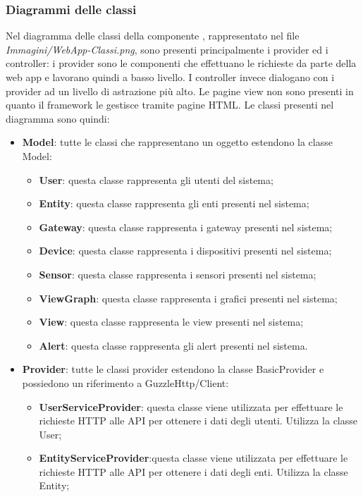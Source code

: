 	\subsubsection{Diagrammi delle classi}%
	Nel diagramma delle classi della componente , rappresentato nel file \textit{Immagini/WebApp-Classi.png}, sono presenti principalmente i provider ed i controller: i provider sono le componenti che effettuano le richieste  da parte della web app e lavorano quindi a basso livello.
	\newline
	I controller invece dialogano con i provider ad un livello di astrazione più alto. Le pagine view non sono presenti in quanto il framework  le gestisce tramite pagine HTML.
	Le classi presenti nel diagramma sono quindi:
	\begin{itemize}
		\item \textbf{Model}: tutte le classi che rappresentano un oggetto estendono la classe Model:
		\begin{itemize}
			\item \textbf{User}: questa classe rappresenta gli utenti del sistema;
			\item \textbf{Entity}: questa classe rappresenta gli enti presenti nel sistema;
			\item \textbf{Gateway}: questa classe rappresenta i gateway presenti nel sistema;
			\item \textbf{Device}: questa classe rappresenta i dispositivi presenti nel sistema;
			\item \textbf{Sensor}: questa classe rappresenta i sensori presenti nel sistema;
			\item \textbf{ViewGraph}: questa classe rappresenta i grafici presenti nel sistema;
			\item \textbf{View}: questa classe rappresenta le view presenti nel sistema;
			\item \textbf{Alert}: questa classe rappresenta gli alert presenti nel sistema.
		\end{itemize}
		\item \textbf{Provider}: tutte le classi provider estendono la classe BasicProvider e possiedono un riferimento a GuzzleHttp/Client:
		\begin{itemize}
			\item \textbf{UserServiceProvider}: questa classe viene utilizzata per effettuare le richieste HTTP alle API per ottenere i dati degli utenti. Utilizza la classe User;
			\item \textbf{EntityServiceProvider}:questa classe viene utilizzata per effettuare le richieste HTTP alle API per ottenere i dati degli enti. Utilizza la classe Entity;

\end{itemize}
\end{itemize}
